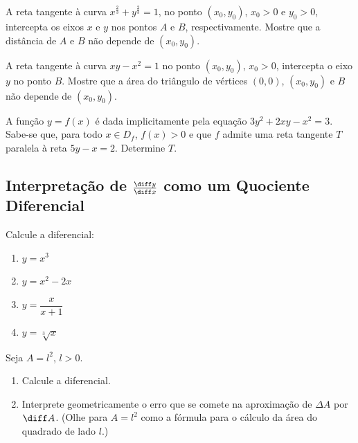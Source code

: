 \begin{exercicio}[9]
\label{ex:7.13.9}
A reta tangente à curva $x^{\frac{2}{3}} + y^{\frac{2}{3}} = 1$, no ponto $(x_0, y_0)$, $x_0 > 0$ e $y_0 > 0$, intercepta os eixos $x$ e $y$ nos pontos $A$ e $B$, respectivamente. Mostre que a distância de $A$ e $B$ não depende de $(x_0, y_0)$.
\end{exercicio}

\begin{exercicio}[10]
\label{ex:7.13.10}
A reta tangente à curva $xy - x^2 = 1$ no ponto $(x_0, y_0)$, $x_0 > 0$, intercepta o eixo $y$ no ponto $B$. Mostre que a área do triângulo de vértices $(0,0)$, $(x_0, y_0)$ e $B$ não depende de $(x_0, y_0)$.
\end{exercicio}

\begin{exercicio}[11]
\label{ex:7.13.11}
A função $y = f(x)$ é dada implicitamente pela equação $3y^2 + 2xy - x^2 = 3$. Sabe-se que, para todo $x \in D_f$, $f(x) > 0$ e que $f$ admite uma reta tangente $T$ paralela à reta $5y - x = 2$. Determine $T$.
\end{exercicio}

\clearpage

\subsection{Interpretação de $\frac{\diff y}{\diff x}$ como um Quociente Diferencial}

\begin{exercicio}[1]
\label{ex:7.14.1}
Calcule a diferencial:
\begin{enumerate}[label=\alph*)]
    \item $y = x^3$
    \item $y = x^2 - 2x$
    \item $y = \dfrac{x}{x + 1}$
    \item $y = \sqrt[3]{x}$
\end{enumerate}
\end{exercicio}

\begin{exercicio}[2]
\label{ex:7.14.2}
Seja $A = l^2$, $l > 0$.
\begin{enumerate}[label=\alph*)]
    \item Calcule a diferencial.
    \item Interprete geometricamente o erro que se comete na aproximação de $\Delta A$ por $\diff A$. (Olhe para $A = l^2$ como a fórmula para o cálculo da área do quadrado de lado $l$.)
\end{enumerate}
\end{exercicio}


